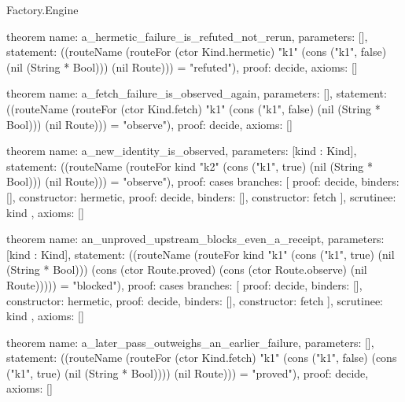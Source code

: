 \begin{lexlean}{Factory.Engine}
\begin{semanticmodule}
theorem{
  name: a_hermetic_failure_is_refuted_not_rerun,
  parameters: [],
  statement: ((routeName (routeFor (ctor Kind.hermetic) "k1" (cons ("k1", false) (nil (String * Bool))) (nil Route))) = "refuted"),
  proof: decide{},
  axioms: []
}

theorem{
  name: a_fetch_failure_is_observed_again,
  parameters: [],
  statement: ((routeName (routeFor (ctor Kind.fetch) "k1" (cons ("k1", false) (nil (String * Bool))) (nil Route))) = "observe"),
  proof: decide{},
  axioms: []
}

theorem{
  name: a_new_identity_is_observed,
  parameters: [kind : Kind],
  statement: ((routeName (routeFor kind "k2" (cons ("k1", true) (nil (String * Bool))) (nil Route))) = "observe"),
  proof: cases{
    branches: [
      {proof: decide{}, binders: [], constructor: hermetic},
      {proof: decide{}, binders: [], constructor: fetch}
    ],
    scrutinee: kind
  },
  axioms: []
}

theorem{
  name: an_unproved_upstream_blocks_even_a_receipt,
  parameters: [kind : Kind],
  statement: ((routeName (routeFor kind "k1" (cons ("k1", true) (nil (String * Bool))) (cons (ctor Route.proved) (cons (ctor Route.observe) (nil Route))))) = "blocked"),
  proof: cases{
    branches: [
      {proof: decide{}, binders: [], constructor: hermetic},
      {proof: decide{}, binders: [], constructor: fetch}
    ],
    scrutinee: kind
  },
  axioms: []
}

theorem{
  name: a_later_pass_outweighs_an_earlier_failure,
  parameters: [],
  statement: ((routeName (routeFor (ctor Kind.fetch) "k1" (cons ("k1", false) (cons ("k1", true) (nil (String * Bool)))) (nil Route))) = "proved"),
  proof: decide{},
  axioms: []
}
\end{semanticmodule}
\end{lexlean}
